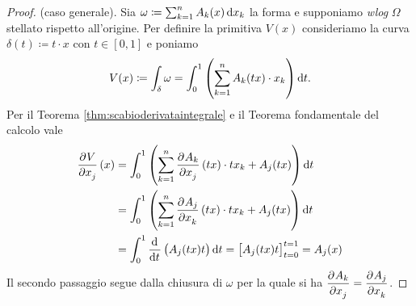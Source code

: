 \begin{proof}
	(caso generale).
	Sia $ \omega \coloneqq \sum_{k = 1}^{n} A_k(x) \dif{x_k} $ la forma e supponiamo \emph{wlog} $ \Omega $ stellato rispetto all'origine. Per definire la primitiva $ V(x) $ consideriamo la curva $ \delta(t) \coloneqq t \cdot x $ con $ t \in [0, 1] $ e poniamo
	\[
		V(x) \coloneqq \int_{\delta} \omega = \int_{0}^{1} \left(\sum_{k = 1}^{n} A_k(tx) \cdot x_k\right) \dif{t}.
	\]
	Per il Teorema \ref{thm:scabioderivataintegrale} e il Teorema fondamentale del calcolo vale
	\begin{align*}
		\dpd{V}{x_j}(x) & = \int_{0}^{1} \left(\sum_{k = 1}^{n} \dpd{A_k}{x_j}(tx) \cdot tx_k + A_j(tx)\right)\dif{t} \\
		& = \int_{0}^{1} \left(\sum_{k = 1}^{n} \dpd{A_j}{x_k}(tx) \cdot tx_k + A_j(tx)\right)\dif{t} \\
		& = \int_{0}^{1} \dod{}{t}\left(A_j(tx) t\right) \dif{t} = \left[A_j(tx) t\right]_{t = 0}^{t = 1} = A_j(x)
	\end{align*}
	Il secondo passaggio segue dalla chiusura di $ \omega $ per la quale si ha $ \dpd{A_k}{x_j} = \dpd{A_j}{x_k} $.
\end{proof}

